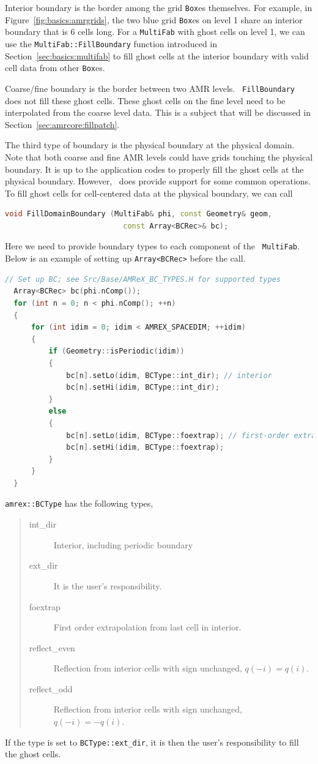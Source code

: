 {{Interior boundary is the border among the grid {\tt Box}es themselves.
For example, in Figure~\ref{fig:basics:amrgrids}, the two blue grid
{\tt Box}es on level 1 share an interior boundary that is 6 cells
long.  For a {\tt MultiFab} with ghost cells on level 1, we can use
the {\tt MultiFab::FillBoundary} function introduced in
Section~\ref{sec:basics:multifab} to fill ghost cells at the interior
boundary with valid cell data from other {\tt Box}es.

Coarse/fine boundary is the border between two AMR levels.  {\tt
FillBoundary} does not fill these ghost cells.  These ghost cells on
the fine level need to be interpolated from the coarse level data.
This is a subject that will be discussed in
Section~\ref{sec:amrcore:fillpatch}. 

The third type of boundary is the physical boundary at the physical
domain.  Note that both coarse and fine AMR levels could have grids
touching the physical boundary.  It is up to the application codes to
properly fill the ghost cells at the physical boundary.  However,
\amrex\ does provide support for some common operations.  To fill
ghost cells for cell-centered data at the physical boundary, we can
call
\begin{lstlisting}[language=cpp]
  void FillDomainBoundary (MultiFab& phi, const Geometry& geom,
                           const Array<BCRec>& bc);
\end{lstlisting}
Here we need to provide boundary types to each component of the {\tt
  MultiFab}.  Below is an example of setting up {\tt Array<BCRec>}
before the call.
\begin{lstlisting}[language=cpp]
  // Set up BC; see Src/Base/AMReX_BC_TYPES.H for supported types
  Array<BCRec> bc(phi.nComp());
  for (int n = 0; n < phi.nComp(); ++n)
  {
      for (int idim = 0; idim < AMREX_SPACEDIM; ++idim)
      {
          if (Geometry::isPeriodic(idim))
          {
              bc[n].setLo(idim, BCType::int_dir); // interior
              bc[n].setHi(idim, BCType::int_dir);
          }
          else
          {
              bc[n].setLo(idim, BCType::foextrap); // first-order extrapolation
              bc[n].setHi(idim, BCType::foextrap);
          }
      }
  }
\end{lstlisting}
{\tt amrex::BCType} has the following types,
\begin{quote}
\begin{description}
\item [int\_dir] Interior, including periodic boundary
\item [ext\_dir] It is the user's responsibility.
\item [foextrap] First order extrapolation from last cell in interior.
\item [reflect\_even] Reflection from interior cells with sign
  unchanged, $q(-i) = q(i)$.
\item [reflect\_odd] Reflection from interior cells with sign
  unchanged, $q(-i) = -q(i)$.
\end{description}
\end{quote}
If the type is set to {\tt BCType::ext\_dir}, it is then the user's
responsibility to fill the ghost cells.

}}
